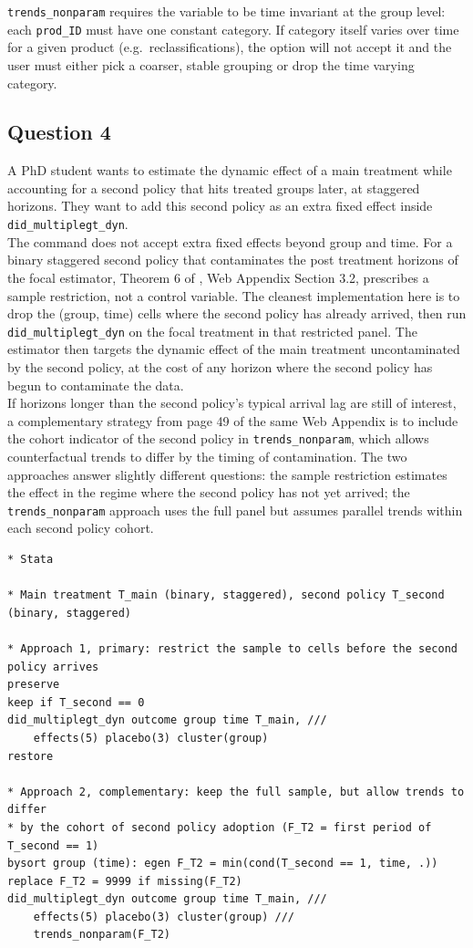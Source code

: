  \texttt{trends\_nonparam} requires the variable to be time invariant at the group level: each \texttt{prod\_ID} must have one constant category. If category itself varies over time for a given product (e.g.\ reclassifications), the option will not accept it and the user must either pick a coarser, stable grouping or drop the time varying category.

\subsection*{Question 4}

 A PhD student wants to estimate the dynamic effect of a main treatment while accounting for a second policy that hits treated groups later, at staggered horizons. They want to add this second policy as an extra fixed effect inside \texttt{did\_multiplegt\_dyn}.\\

 The command does not accept extra fixed effects beyond group and time. For a binary staggered second policy that contaminates the post treatment horizons of the focal estimator, Theorem 6 of \citet{dCDH2023}, Web Appendix Section 3.2, prescribes a sample restriction, not a control variable. The cleanest implementation here is to drop the (group, time) cells where the second policy has already arrived, then run \texttt{did\_multiplegt\_dyn} on the focal treatment in that restricted panel. The estimator then targets the dynamic effect of the main treatment uncontaminated by the second policy, at the cost of any horizon where the second policy has begun to contaminate the data.\\

If horizons longer than the second policy's typical arrival lag are still of interest, a complementary strategy from page 49 of the same Web Appendix is to include the cohort indicator of the second policy in \texttt{trends\_nonparam}, which allows counterfactual trends to differ by the timing of contamination. The two approaches answer slightly different questions: the sample restriction estimates the effect in the regime where the second policy has not yet arrived; the \texttt{trends\_nonparam} approach uses the full panel but assumes parallel trends within each second policy cohort.\\


\begin{lstlisting}
* Stata

* Main treatment T_main (binary, staggered), second policy T_second (binary, staggered)

* Approach 1, primary: restrict the sample to cells before the second policy arrives
preserve
keep if T_second == 0
did_multiplegt_dyn outcome group time T_main, ///
    effects(5) placebo(3) cluster(group)
restore

* Approach 2, complementary: keep the full sample, but allow trends to differ
* by the cohort of second policy adoption (F_T2 = first period of T_second == 1)
bysort group (time): egen F_T2 = min(cond(T_second == 1, time, .))
replace F_T2 = 9999 if missing(F_T2)
did_multiplegt_dyn outcome group time T_main, ///
    effects(5) placebo(3) cluster(group) ///
    trends_nonparam(F_T2)
\end{lstlisting}


